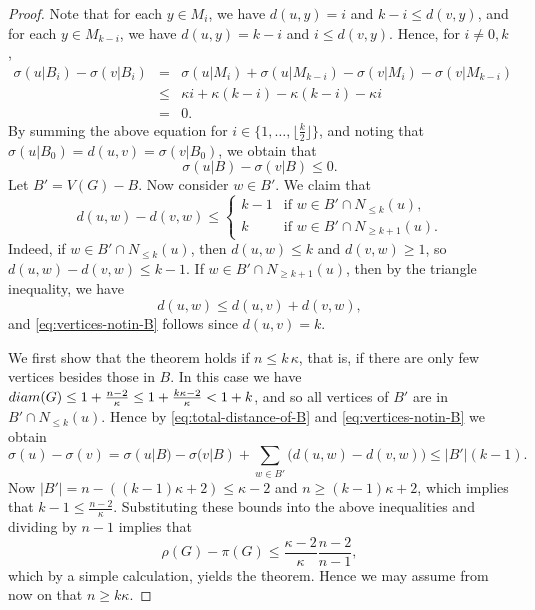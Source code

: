 \documentclass[10pt,a4paper]{amsart}
\begin{document}
\begin{proof}
Note that for each \( y \in M_i \), we have \( d(u, y) = i \) and \( k-i \leq d(v, y) \), and for each \( y \in M_{k-i} \), we have \( d(u, y) = k - i \) and \( i \leq d(v, y)  \). Hence, for $i \neq 0,k$, 
\begin{eqnarray*}
\sigma(u|B_i) - \sigma(v|B_i) 
  &=&  \sigma(u|M_i) + \sigma(u|M_{k-i}) - \sigma(v|M_i) - \sigma(v|M_{k-i}) \\
& \leq&  \kappa i + \kappa(k-i) - \kappa(k-i) - \kappa i \\
& =&  0.
\end{eqnarray*}
By summing the above equation for \( i \in \{1, \ldots, \lfloor\frac{k}{2}\rfloor\} \), and noting 
that \(\sigma(u|B_0) = d(u,v) = \sigma(v|B_0) \), we obtain that 
\begin{equation}\label{eq:total-distance-of-B}
\sigma(u|B) - \sigma(v|B) \leq 0.
\end{equation}
Let $B'=V(G)-B$. Now consider \( w \in B' \). We claim that
\begin{equation} \label{eq:vertices-notin-B} 
d(u,w) - d(v,w) \leq \left\{ \begin{array}{cl}
k-1 & \textrm{if $w \in B' \cap N_{\leq k}(u)$,} \\
k & \textrm{if $w \in B' \cap N_{\geq k+1}(u)$.}
\end{array} \right. 
\end{equation}
Indeed, if $w \in B' \cap N_{\leq k}(u)$, then $d(u,w) \leq k$ and $d(v,w) \geq 1$, so 
$d(u,w) - d(v,w) \leq k-1$. If $w \in B' \cap N_{\geq k+1}(u)$, then 
by the triangle inequality, we have
\[
d(u, w) \leq d(u, v) + d(v, w),
\]
and \eqref{eq:vertices-notin-B} follows since $d(u,v)=k$. 


We first show that the theorem holds if $n \leq k\, \kappa$, that is, if there are only few vertices
besides those in $B$. In this case we have  
${\rm diam}(G) \leq 1 + \frac{n-2}{\kappa} \leq 1 + \frac{k\kappa-2}{\kappa} < 1+k$,
and so all vertices of $B'$ are in $B' \cap N_{\leq k}(u)$. Hence by 
\eqref{eq:total-distance-of-B} and \eqref{eq:vertices-notin-B} we obtain
\[ \sigma(u) - \sigma(v) = \sigma(u|B) - \sigma(v|B) + \sum_{w \in B'} \big( d(u,w)-d(v,w)\big)  
           \leq |B'|(k-1). \]
Now $|B'|=n-((k-1)\kappa+2) \leq \kappa-2$ and $n \geq (k-1)\kappa+2$, which implies that
$k-1 \leq \frac{n-2}{\kappa}$. Substituting these bounds into the above inequalities and 
dividing by $n-1$ implies that
\[ \rho(G) - \pi(G) \leq \frac{\kappa-2}{\kappa} \frac{n-2}{n-1}, \]
which by a simple calculation,
yields the theorem. Hence we may assume from now on that $n \geq k \kappa$. 


\end{proof}
\end{document}
